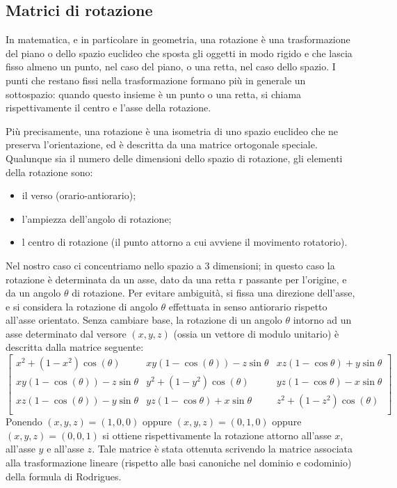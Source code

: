 \subsection{Matrici di rotazione}\label{subsec:matrici_rotazione}
In matematica, e in particolare in geometria, una rotazione è una trasformazione del piano o dello spazio euclideo che sposta gli oggetti in modo rigido e che lascia fisso almeno un punto, nel caso del piano, o una retta, nel caso dello spazio. I punti che restano fissi nella trasformazione formano più in generale un sottospazio: quando questo insieme è un punto o una retta, si chiama rispettivamente il centro e l'asse della rotazione.

Più precisamente, una rotazione è una isometria di uno spazio euclideo che ne preserva l'orientazione, ed è descritta da una matrice ortogonale speciale. Qualunque sia il numero delle dimensioni dello spazio di rotazione, gli elementi della rotazione sono:
\vspace{10pt}
\begin{itemize}
	\item il verso (orario-antiorario);
	\vspace{5pt}
	\item l'ampiezza dell'angolo di rotazione;
	\vspace{5pt}
	\item l centro di rotazione (il punto attorno a cui avviene il movimento rotatorio).
\end{itemize}

Nel nostro caso ci concentriamo nello spazio a 3 dimensioni; in questo caso la rotazione è determinata da un asse, dato da una retta r passante per l'origine, e da un angolo $\theta$ di rotazione. Per evitare ambiguità, si fissa una direzione dell'asse, e si considera la rotazione di angolo $\theta$ effettuata in senso antiorario rispetto all'asse orientato. Senza cambiare base, la rotazione di un angolo $\theta$ intorno ad un asse determinato dal versore $(x, y, z)$ (ossia un vettore di modulo unitario) è descritta dalla matrice seguente:
$$
\begin{bmatrix}
	x^2+(1-x^2)\cos(\theta) & xy(1-\cos(\theta))-z\sin{\theta} & xz(1-\cos{\theta})+y\sin{\theta} \\
	xy(1-\cos(\theta))-z\sin{\theta} & y^2+(1-y^2)\cos(\theta) & yz(1-\cos{\theta})-x\sin{\theta} \\
	xz(1-\cos(\theta))-y\sin{\theta} & yz(1-\cos{\theta})+x\sin{\theta} & z^2+(1-z^2)\cos(\theta) \\
\end{bmatrix}
$$
Ponendo $(x, y, z) = (1, 0, 0)$ oppure $(x, y, z) = (0, 1, 0)$ oppure $(x, y, z) = (0, 0, 1)$ si ottiene rispettivamente la rotazione attorno all'asse $x$, all'asse $y$ e all'asse $z$. 
Tale matrice è stata ottenuta scrivendo la matrice associata alla trasformazione lineare (rispetto alle basi canoniche nel dominio e codominio) della formula di Rodrigues.

